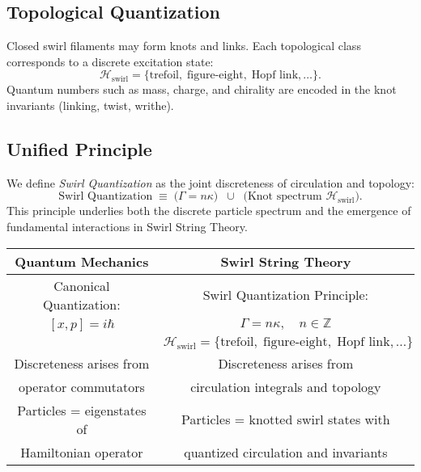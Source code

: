 \documentclass[11pt, a4paper]{article}
\begin{document}
    \subsection{Topological Quantization}
    Closed swirl filaments may form knots and links. Each topological class corresponds to a discrete excitation state:
    \begin{equation}
        \mathcal{H}_\text{swirl}
        = \{ \text{trefoil}, \; \text{figure-eight}, \; \text{Hopf link}, \dots \}.
    \end{equation}
    Quantum numbers such as mass, charge, and chirality are encoded in the knot invariants (linking, twist, writhe).

    \subsection{Unified Principle}
    We define \emph{Swirl Quantization} as the joint discreteness of circulation and topology:
    \[
        \text{Swirl Quantization} \;\equiv\;
        \Big( \Gamma = n\kappa \Big)
        \;\; \cup \;\;
        \Big( \text{Knot spectrum } \mathcal{H}_\text{swirl} \Big).
    \]
    This principle underlies both the discrete particle spectrum and the emergence of fundamental interactions in Swirl String Theory.

    \begin{center}
        \begin{tabular}{|c|c|}
            \hline
            \textbf{Quantum Mechanics} & \textbf{Swirl String Theory} \\
            \hline
            Canonical Quantization: & Swirl Quantization Principle: \\
            $[x, p] = i \hbar$ & $\Gamma = n \kappa, \quad n \in \mathbb{Z}$ \\[6pt]
            & $\mathcal{H}_\text{swirl} =
            \{ \text{trefoil}, \; \text{figure-eight}, \; \text{Hopf link}, \dots \}$ \\
            \hline
            Discreteness arises from & Discreteness arises from \\
            operator commutators & circulation integrals and topology \\
            \hline
            Particles = eigenstates of & Particles = knotted swirl states with \\
            Hamiltonian operator & quantized circulation and invariants \\
            \hline
        \end{tabular}
    \end{center}
\end{document}

